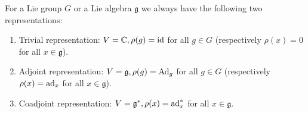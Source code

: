 \documentclass{report}
\begin{document}
\begin{example}
    For a Lie group $G$ or a Lie algebra $\mathfrak g$ we always have the following two representations:
    \begin{enumerate}[label = (\roman*)]
        \item Trivial representation: $V = \mathbb C, \rho(g) = \operatorname{id}$ for all $g \in G$ (respectively $\rho(x) = 0$ for all $x \in \mathfrak g$). 
        \item Adjoint representation: $V = \mathfrak g, \rho(g) = \operatorname{Ad}_g$ for all $g \in G$ (respectively $\rho(x) = \operatorname{ad}_x$ for all $x \in \mathfrak g$). 
        \item Coadjoint representation: $V = \mathfrak g^*, \rho(x) = \operatorname{ad}_x^* $ for all $x \in \mathfrak g$.
    \end{enumerate}
\end{example}
\end{document}
